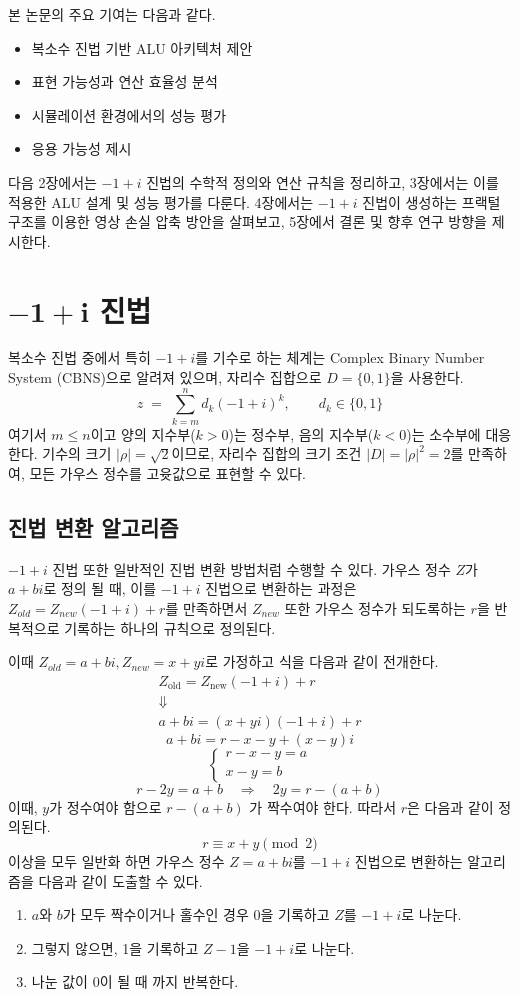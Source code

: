 \documentclass[10pt,a4paper,notitlepage]{report}
\begin{document}
\begin{multicols*}{2}
본 논문의 주요 기여는 다음과 같다.
\begin{itemize}
\item 복소수 진법 기반 ALU 아키텍처 제안
\item 표현 가능성과 연산 효율성 분석
\item 시뮬레이션 환경에서의 성능 평가
\item 응용 가능성 제시
\end{itemize}
\vspace{0.4cm}

다음 2장에서는 $-1+i$ 진법의 수학적 정의와 연산 규칙을 정리하고, 3장에서는 이를 적용한 ALU 설계 및 성능 평가를 다룬다. 4장에서는 $-1+i$ 진법이 생성하는 프랙털 구조를 이용한 영상 손실 압축 방안을 살펴보고, 5장에서 결론 및 향후 연구 방향을 제시한다.

\section{\texorpdfstring{\(\bm{-1+i}\) 진법}{-1 + i 진법}}
복소수 진법 중에서 특히 $-1 + i$를 기수로 하는 체계는 Complex Binary Number System (CBNS)으로 알려져 있으며, 자리수 집합으로 $D = \{0, 1\}$을 사용한다.
$$
z \;=\; \sum_{k=m}^{n} d_k(-1+i)^k,\qquad d_k\in\{0,1\}
$$
여기서 $m\le n$이고 양의 지수부($k>0$)는 정수부, 음의 지수부($k<0$)는 소수부에 대응한다. 기수의 크기 $|\rho|=\sqrt{2}$이므로, 자리수 집합의 크기 조건 $|D|=|\rho|^2=2$를 만족하여, 모든 가우스 정수를 고윳값으로 표현할 수 있다.

\subsection{진법 변환 알고리즘}
$-1 + i$ 진법 또한 일반적인 진법 변환 방법처럼 수행할 수 있다. 가우스 정수 $Z$가 $a + bi$로 정의 될 때, 이를 $-1 + i$ 진법으로 변환하는 과정은 $Z_{old} = Z_{new}(-1+i)+r$를 만족하면서 $Z_{new}$ 또한 가우스 정수가 되도록하는 $r$을 반복적으로 기록하는 하나의 규칙으로 정의된다.

이때 $Z_{old}=a + bi, Z_{new}=x+yi$로 가정하고 식을 다음과 같이 전개한다.
$$
\begin{gathered}
Z_{\text{old}} = Z_{\text{new}}(-1+i) + r \\
\Downarrow \\
a + bi = (x+yi)(-1+i) + r
\end{gathered}
$$
$$
a + bi = r-x-y+(x-y)i
$$
$$
\begin{cases}
r-x-y = a\\
x-y = b
\end{cases}
$$
$$
r - 2y = a + b \quad\Rightarrow\quad 2y = r - (a+b)
$$
이때, $y$가 정수여야 함으로 $r - (a+b)$ 가 짝수여야 한다. 따라서 $r$은 다음과 같이 정의된다.
$$
r \equiv x+y \pmod 2
$$
이상을 모두 일반화 하면 가우스 정수 $Z=a + bi$를 $-1 + i$ 진법으로 변환하는 알고리즘을 다음과 같이 도출할 수 있다.
\begin{enumerate}
\item $a$와 $b$가 모두 짝수이거나 홀수인 경우 0을 기록하고 $Z$를 $-1 + i$로 나눈다.
\item 그렇지 않으면, 1을 기록하고 $Z-1$을 $-1 + i$로 나눈다.
\item 나눈 값이 $0$이 될 때 까지 반복한다.
\end{enumerate}


\end{multicols*}
\end{document}
